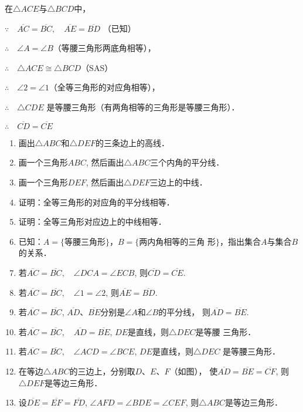 \begin{solution}
在$\triangle ACE$与$\triangle BCD$中，

$\because\quad \overline{AC}=\overline{BC},\quad \overline{AE}=\overline{BD}$ （已知）

$\therefore\quad \angle A=\angle B$（等腰三角形两底角相等），

$\therefore\quad \triangle ACE\cong \triangle BCD$（SAS）

$\therefore\quad \angle 2=\angle 1$（全等三角形的对应角相等），

$\therefore\quad \triangle CDE$ 是等腰三角形（有两角相等的三角形是等腰三角形）．

$\therefore\quad \overline{CD}=\overline{CE}$
\end{solution}

\begin{ex}
\begin{enumerate}
    \item 画出$\triangle ABC$和$\triangle DEF$的三条边上的高线．
    \item 画一个三角形$ABC$, 然后画出$\triangle ABC$三个内角的平分线．
    \item 画一个三角形$DEF$, 然后画出$\triangle DEF$三边上的中线．
    \item 证明：全等三角形的对应角的平分线相等．
    \item 证明：全等三角形对应边上的中线相等．
    \item 已知：$A=\{\text{等腰三角形}\}$，$B=\{\text{两内角相等的三角
    形}\}$，指出集合$A$与集合$B$的关系．
    \item 若$\overline{AC}=\overline{BC},\quad \angle DCA=\angle ECB$, 则$\overline{CD}=\overline{CE}$.
    \item 若$\overline{AC}=\overline{BC},\quad \angle 1=\angle 2$, 则$\overline{AE}=\overline{BD}$.
    \item 若$\overline{AC}=\overline{BC}$, $\overline{AD}$、$\overline{BE}$分别是$\angle A$和$\angle B$的平分线，
    则$\overline{AD}=\overline{BE}$.
    \item 若$\overline{AC}=\overline{BC},\quad \overline{AD}=\overline{BE}$, $DE$是直线，则$\triangle DEC$是等腰
三角形．
\item 若$\overline{AC}=\overline{BC},\quad \angle ACD=\angle BCE$, $DE$是直线，则$\triangle DEC$
是等腰三角形．
\item 在等边$\triangle ABC$的三边上，分别取$D$、$E$、$F$（如图），
使$\overline{AD}=\overline{BE}=\overline{CF}$, 则$\triangle DEF$是等边三角形．
\item 设$\overline{DE}=\overline{EF}=\overline{FD}$, $\angle AFD=\angle BDE=\angle CEF$, 
则$\triangle ABC$是等边三角形．
\end{enumerate}
\end{ex}

